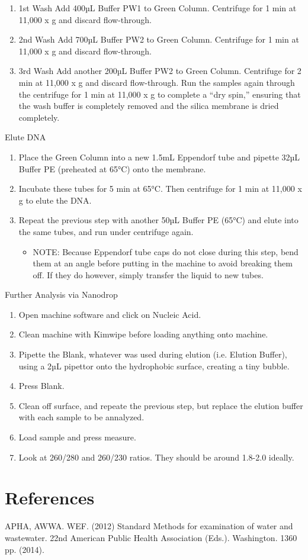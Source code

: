 \documentclass[12pt]{../SOP3_alpha}
\begin{document}
\begin{enumerate}
  \item 1st Wash
Add 400µL Buffer PW1 to Green Column. Centrifuge for 1 min at 11,000 x g and discard flow-through.
\item 2nd Wash
Add 700µL Buffer PW2 to Green Column. Centrifuge for 1 min at 11,000 x g and discard flow-through.
\item 3rd Wash
Add another 200µL Buffer PW2 to Green Column. Centrifuge for 2 min at 11,000 x g and discard flow-through. Run the samples again through the centrifuge for 1 min at 11,000 x g to complete a “dry spin,” ensuring that the wash buffer is completely removed and the silica membrane is dried completely. 
\end{enumerate}

\NP Elute DNA
\begin{enumerate}
  \item Place the Green Column into a new 1.5mL Eppendorf tube and pipette 32µL Buffer PE (preheated at 65°C) onto the membrane. 
  \item Incubate these tubes for 5 min at 65°C. Then centrifuge for 1 min at 11,000 x g to elute the DNA.
  \item Repeat the previous step with another 50µL Buffer PE (65°C) and elute into the same tubes, and run under centrifuge again.
  \begin{itemize}
  \item NOTE: Because Eppendorf tube caps do not close during this step, bend them at an angle before putting in the machine to avoid breaking them off. If they do however, simply transfer the liquid to new tubes.
  \end{itemize}
\end{enumerate}

\NP Further Analysis via Nanodrop
\begin{enumerate}
  \item Open machine software and click on Nucleic Acid.
  \item Clean machine with Kimwipe before loading anything onto machine. 
  \item Pipette the Blank, whatever was used during elution (i.e. Elution Buffer), using a 2µL pipettor onto the hydrophobic surface, creating a tiny bubble.
  \item Press Blank.
  \item Clean off surface, and repeate the previous step, but replace the elution buffer with each sample to be annalyzed.
  \item Load sample and press measure.
  \item Look at 260/280 and 260/230 ratios. They should be around 1.8-2.0 ideally. 
\end{enumerate}

\section{References}

\NP APHA, AWWA. WEF. (2012) Standard Methods for examination of water and wastewater. 22nd American Public Health Association (Eds.). Washington. 1360 pp. (2014).
\end{document}
